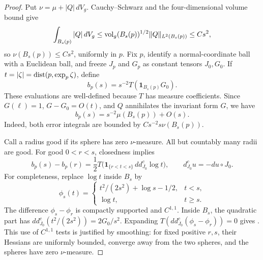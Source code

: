 \begin{proof}
Put \(\nu=\mu+|Q|\,dV_g\).  Cauchy--Schwarz and the four-dimensional
volume bound give
\[
 \int_{B_s(p)}|Q|\,dV_g
 \le \operatorname{vol}_g(B_s(p))^{1/2}\|Q\|_{L^2(B_s(p))}
 \le Cs^2,
\]
so \(\nu(B_s(p))\le Cs^2\), uniformly in \(p\).
Fix \(p\), identify a normal-coordinate ball with a Euclidean ball, and
freeze \(J_p\) and \(G_p\) as constant tensors \(J_0,G_0\).  If
\(t=|\zeta|=\operatorname{dist}(p,\exp_p\zeta)\), define
\[
 b_p(s)=s^{-2}T(\mathbf1_{B_s(p)}G_0).
 \]
These evaluations are well-defined because \(T\) has measure
coefficients.  Since \(G(\ell)=1\), \(G-G_0=O(t)\), and \(Q\) annihilates
the invariant form \(G\), we have
\begin{equation}\label{eq:density-frozen-ratio}
 b_p(s)=s^{-2}\mu(B_s(p))+O(s).
\end{equation}
Indeed, both error integrals are bounded by
\(Cs^{-2}s\nu(B_s(p))\).

Call a radius good if its sphere has zero \(\nu\)-measure.  All but
countably many radii are good.  For good \(0<r<s\), closedness implies
\begin{equation}\label{eq:density-frozen-monotonicity}
 b_p(s)-b_p(r)
 =\frac12 T\bigl(\mathbf1_{\{r<t<s\}}\,dd^c_{J_0}\log t\bigr),
 \qquad d^c_{J_0}u=-du\circ J_0.
\end{equation}
For completeness, replace \(\log t\) inside \(B_s\) by
\[
 \phi_s(t)=
 \begin{cases}
 t^2/(2s^2)+\log s-1/2,&t<s,\\
 \log t,&t\ge s.
 \end{cases}
\]
The difference \(\phi_s-\phi_r\) is compactly supported and \(C^{1,1}\).
Inside \(B_s\), the quadratic part has
\(dd^c_{J_0}(t^2/(2s^2))=2G_0/s^2\).  Expanding
\(T(dd^c_{J_0}(\phi_s-\phi_r))=0\) gives
.
This use of \(C^{1,1}\) tests is justified by smoothing: for fixed
positive \(r,s\), their Hessians are uniformly bounded, converge away
from the two spheres, and the spheres have zero \(\nu\)-measure.


\end{proof}
